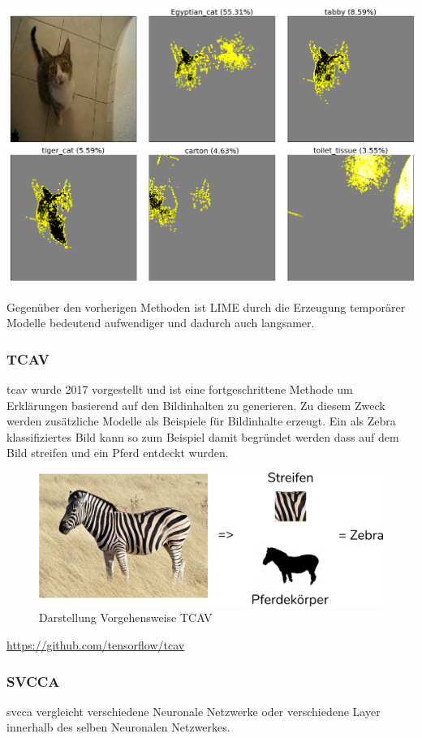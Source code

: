 \documentclass[
  12pt, %
  a4paper, %
  oneside, %
  openany, 
  numbers=noenddot, %
  BCOR=5mm, %
  parskip=half*, %
  thesis, %
]{bfhbook}
\begin{document}
\includegraphics[width=\textwidth]{Bilder/Lime-Classes.png}

Gegenüber den vorherigen Methoden ist LIME durch die Erzeugung temporärer Modelle bedeutend aufwendiger und dadurch auch langsamer.
\clearpage
\subsubsection*{TCAV}
 \acrfull{tcav} wurde 2017 vorgestellt \parencite{Kim2017} und ist eine fortgeschrittene Methode um Erklärungen basierend auf den Bildinhalten zu generieren. Zu diesem Zweck werden zusätzliche Modelle als Beispiele für Bildinhalte erzeugt. Ein als Zebra klassifiziertes Bild kann so zum Beispiel damit begründet werden dass auf dem Bild streifen und ein Pferd entdeckt wurden.
 \begin{figure}[ht]
\centering
\includegraphics[width=\textwidth]{Bilder/Zebra-Explanation.PNG}
\caption{Darstellung Vorgehensweise TCAV}
\end{figure}
\url{https://github.com/tensorflow/tcav}

\subsubsection*{SVCCA}
\acrfull{svcca} vergleicht verschiedene Neuronale Netzwerke oder verschiedene Layer innerhalb des selben Neuronalen Netzwerkes.
\end{document}
